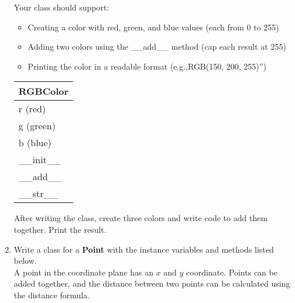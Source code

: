 \documentclass{article}
\newcommand{\csq}[1]{\reflectbox{''}#1''}  %
\begin{document}
\begin{enumerate}
\begin{minipage}[t]{0.7\textwidth}
			Your class should support:
			\begin{itemize}
				\item Creating a color with red, green, and blue values (each from 0 to 255)
				\item Adding two colors using the \_\_add\_\_ method (cap each result at 255)
				\item Printing the color in a readable format (e.g.,\csq{RGB(150, 200, 255)})
			\end{itemize}
		\end{minipage}
		\hfill
		\begin{minipage}[t]{0.25\textwidth}
			\vspace{.2em}
			\begin{flushright}
				\begin{tabular}{|l|}
					\hline
					RGBColor \\ \hline
					r (red) \\
					g (green) \\
					b (blue) \\ \hline
					\_\_init\_\_ \\
					\_\_add\_\_ \\
					\_\_str\_\_ \\ \hline
				\end{tabular}
			\end{flushright}
		\end{minipage}
		
		After writing the class, create three colors and write code to add them together.
		Print the result.

	

	\item
		Write a class for a \textbf{Point} with the instance variables and methods listed below.\\
		A point in the coordinate plane has an $x$ and $y$ coordinate. Points can be added together, 
		and the distance between two points can be calculated using the distance formula.
			

\end{enumerate}
\end{document}
